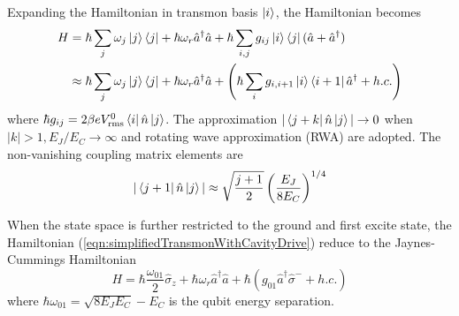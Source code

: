            Expanding the Hamiltonian in transmon basis $ \ket{i} $, the Hamiltonian becomes
            \begin{align}
            \label{eqn:transmonWithCavityDriveExpanded}
                H &= \hbar \sum_j \omega_j \ket j \bra j + \hbar \omega_r \hat a^\dagger \hat a + \hbar \sum_{i,j} g_{ij} \ket i \bra j (\hat a + \hat a^\dagger ) \\
                \label{eqn:simplifiedTransmonWithCavityDrive}
                & \approx \hbar \sum_j \omega_j \ket j \bra j + \hbar \omega_r \hat a^\dagger \hat a  + \left (\hbar \sum_{i} g_{i,i+1} \ket i \bra{i+1} \hat a^\dagger + h.c. \right )
            \end{align}
            where $\hbar g_{ij} = 2 \beta e V^0_{\text{rms}} \bra i \hat n \ket j$. The approximation $ |\bra{j+k}\hat n \ket j| \rightarrow 0  $ when $|k|>1, E_J/E_C \rightarrow \infty $ and rotating wave approximation (RWA) are adopted. The non-vanishing coupling matrix elements are
            \begin{equation}
            \label{eqn:couplingElements}
                | \bra{j+1} \hat n \ket j |\approx \sqrt{ \frac{j+1}{2}} \left ( \frac{E_J}{8E_C} \right )^{1/4} 
            \end{equation}

            When the state space is further restricted to the ground and first excite state, the Hamiltonian (\ref{eqn:simplifiedTransmonWithCavityDrive}) reduce to the Jaynes-Cummings Hamiltonian\cite{walls2007quantum,schuster2007circuit}
            \begin{equation}
            \label{eqn:JCHamiltonian}
                H = \hbar \frac{\omega_{01}}{2} \hat \sigma_z + \hbar \omega_r \hat a^\dagger \hat a  + \hbar (g_{01}\hat a^\dagger \hat \sigma^- + h.c. )
            \end{equation}
            where $ \hbar \omega_{01} = \sqrt{8E_JE_C} - E_C $ is the qubit energy separation.
            
